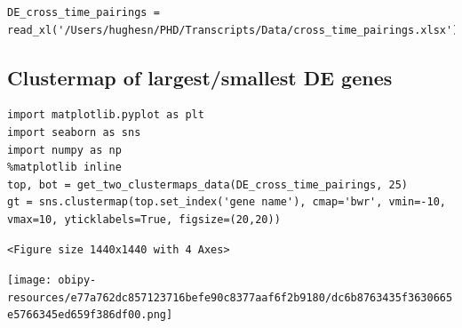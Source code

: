 \documentclass[11pt]{article}
\begin{document}
\begin{verbatim}
DE_cross_time_pairings = read_xl('/Users/hughesn/PHD/Transcripts/Data/cross_time_pairings.xlsx')
\end{verbatim}


\subsection{Clustermap of largest/smallest DE genes}
\label{sec:org316a0e7}
\begin{verbatim}
import matplotlib.pyplot as plt
import seaborn as sns
import numpy as np
%matplotlib inline
top, bot = get_two_clustermaps_data(DE_cross_time_pairings, 25)
gt = sns.clustermap(top.set_index('gene name'), cmap='bwr', vmin=-10, vmax=10, yticklabels=True, figsize=(20,20))
\end{verbatim}

\begin{verbatim}
<Figure size 1440x1440 with 4 Axes>
\end{verbatim}


\begin{center}
\texttt{[image: obipy-resources/e77a762dc857123716befe90c8377aaf6f2b9180/dc6b8763435f3630665e5766345ed659f386df00.png]}
\end{center}
\end{document}

